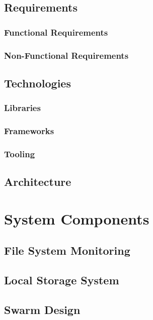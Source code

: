 \documentclass[a4paper, 11pt, twocolumn, twoside]{report}
\begin{document}
\section{Requirements}

\subsection{Functional Requirements}

\subsection{Non-Functional Requirements}

\section{Technologies}

\subsection{Libraries}

\subsection{Frameworks}

\subsection{Tooling}

\section{Architecture}

\chapter{System Components}

\section{File System Monitoring}

\section{Local Storage System}

\section{Swarm Design}
\end{document}
